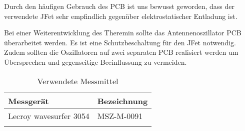 Durch den häufigen Gebrauch des PCB ist uns bewusst geworden, dass der verwendete JFet sehr empfindlich gegenüber elektrostatischer Entladung ist.

Bei einer Weiterentwicklung des Theremin sollte das Antennenoszillator PCB überarbeitet werden. Es ist eine Schutzbeschaltung für den JFet notwendig. Zudem sollten die Oszillatoren auf zwei separaten PCB realisiert werden um Übersprechen und gegenseitige Beeinflussung zu vermeiden. 

\begin{table}[H]
	\centering
	\caption{Verwendete Messmittel}
	\label{tab:Verwendete_Messmittel}
	\begin{tabular}{l|l}
		\textbf{Messgerät} & \textbf{Bezeichnung}	\\
		\hline \hline
		
		Lecroy wavesurfer 3054  &  MSZ-M-0091  \\ 
		&        \\ 
		\hline
		
	\end{tabular}
\end{table} 